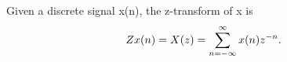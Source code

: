 Given a discrete signal x(n), the z-transform of x is
\[ Z \\{ x ( n ) \\} = X(z) = \sum _{n=- \infty } ^{ \infty }
x(n)z^{-n} . \]